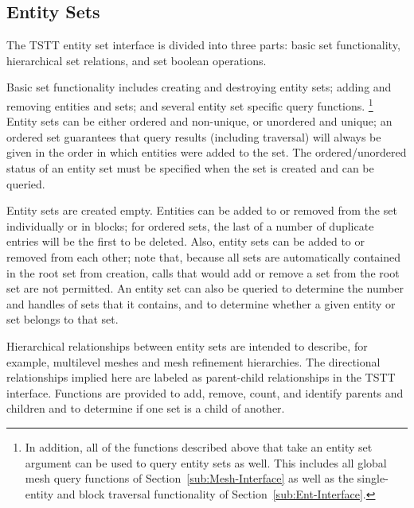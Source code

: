 \subsection{Entity Sets\label{sub:Entity-Set-Interface}}

The TSTT entity set interface is divided into three parts: basic set
functionality, hierarchical set relations, and set boolean operations.

Basic set functionality includes creating and destroying
entity sets; adding and removing entities and sets; and several entity
set specific query functions.%
\footnote{In addition, all of the functions described above that take an entity
set argument can be used to query entity sets as well. This includes
all global mesh query functions of Section~\ref{sub:Mesh-Interface}
as well as the single-entity and block traversal functionality of
Section~\ref{sub:Ent-Interface}.%
} Entity sets can be either ordered and non-unique, or unordered and
unique; an ordered set guarantees that query results (including traversal)
will always be given in the order in which entities were added to
the set. The ordered/unordered status of an entity set must be specified
when the set is created and can be queried. 

Entity sets are created empty. Entities can be added to or removed
from
the set individually or in blocks; for ordered sets, the last of a
number of duplicate entries will be the first to be deleted.  Also,
entity sets can be added to or removed from each other; note that,
because all sets are automatically contained in the root set from
creation, calls that would add or remove a set from the root set are not
permitted.  An entity set can also be queried to determine the number
and handles of sets that it contains, and to determine whether a
given entity or set belongs to that set.

Hierarchical relationships between entity sets are intended to describe,
for example, multilevel meshes and mesh refinement hierarchies. The
directional relationships implied here are labeled as parent-child
relationships in the TSTT interface. Functions are provided to add,
remove, count, and identify parents and children and to determine
if one set is a child of another.

